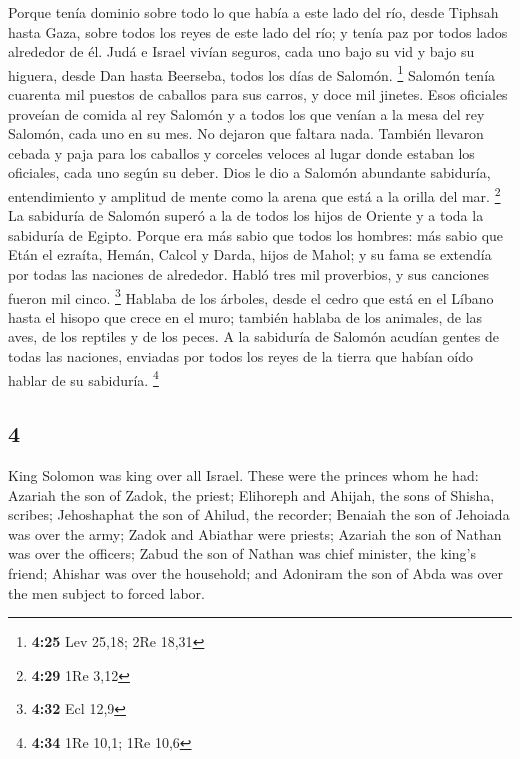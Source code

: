 \begin{paracol}{2}
 Porque tenía dominio sobre todo lo que había a este lado
del río, desde Tiphsah hasta Gaza, sobre todos los reyes de este lado
del río; y tenía paz por todos lados alrededor de él. 
Judá e Israel vivían seguros, cada uno bajo su vid y bajo su higuera,
desde Dan hasta Beerseba, todos los días de Salomón. \footnote{\textbf{4:25}
  Lev 25,18; 2Re 18,31}  Salomón tenía cuarenta mil
puestos de caballos para sus carros, y doce mil jinetes. 
Esos oficiales proveían de comida al rey Salomón y a todos los que
venían a la mesa del rey Salomón, cada uno en su mes. No dejaron que
faltara nada.  También llevaron cebada y paja para los
caballos y corceles veloces al lugar donde estaban los oficiales, cada
uno según su deber.  Dios le dio a Salomón abundante
sabiduría, entendimiento y amplitud de mente como la arena que está a la
orilla del mar. \footnote{\textbf{4:29} 1Re 3,12}  La
sabiduría de Salomón superó a la de todos los hijos de Oriente y a toda
la sabiduría de Egipto.  Porque era más sabio que todos
los hombres: más sabio que Etán el ezraíta, Hemán, Calcol y Darda, hijos
de Mahol; y su fama se extendía por todas las naciones de alrededor.
 Habló tres mil proverbios, y sus canciones fueron mil
cinco. \footnote{\textbf{4:32} Ecl 12,9}  Hablaba de los
árboles, desde el cedro que está en el Líbano hasta el hisopo que crece
en el muro; también hablaba de los animales, de las aves, de los
reptiles y de los peces.  A la sabiduría de Salomón
acudían gentes de todas las naciones, enviadas por todos los reyes de la
tierra que habían oído hablar de su sabiduría. \footnote{\textbf{4:34}
  1Re 10,1; 1Re 10,6}

\switchcolumn
\begin{otherlanguage}{english}

\hypertarget{section-7}{%
\section{4}\label{section-7}}

 King Solomon was king over all Israel. 
These were the princes whom he had: Azariah the son of Zadok, the
priest;  Elihoreph and Ahijah, the sons of Shisha,
scribes; Jehoshaphat the son of Ahilud, the recorder; 
Benaiah the son of Jehoiada was over the army; Zadok and Abiathar were
priests;  Azariah the son of Nathan was over the officers;
Zabud the son of Nathan was chief minister, the king's friend;
 Ahishar was over the household; and Adoniram the son of
Abda was over the men subject to forced labor.


\end{otherlanguage}
\end{paracol}
